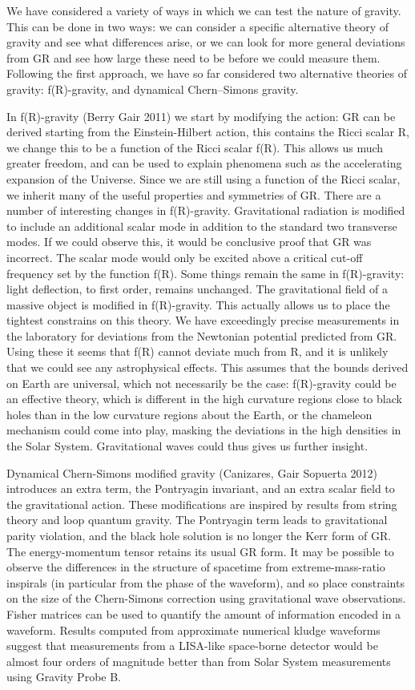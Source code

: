 We have considered a variety of ways in which we can test the nature of gravity. This can be done in two ways: we can consider a specific alternative theory of gravity and see what differences arise, or we can look for more general deviations from GR and see how large these need to be before we could measure them. Following the first approach, we have so far considered two alternative theories of gravity: f(R)-gravity, and dynamical Chern--Simons gravity.

In f(R)-gravity (Berry  Gair 2011) we start by modifying the action: GR can be derived starting from the Einstein-Hilbert action, this contains the Ricci scalar R, we change this to be a function of the Ricci scalar f(R). This allows us much greater freedom, and can be used to explain phenomena such as the accelerating expansion of the Universe. Since we are still using a function of the Ricci scalar, we inherit many of the useful properties and symmetries of GR. There are a number of interesting changes in f(R)-gravity. Gravitational radiation is modified to include an additional scalar mode in addition to the standard two transverse modes. If we could observe this, it would be conclusive proof that GR was incorrect. The scalar mode would only be excited above a critical cut-off frequency set by the function f(R). Some things remain the same in f(R)-gravity: light deflection, to first order, remains unchanged. The gravitational field of a massive object is modified in f(R)-gravity. This actually allows us to place the tightest constrains on this theory. We have exceedingly precise measurements in the laboratory for deviations from the Newtonian potential predicted from GR. Using these it seems that f(R) cannot deviate much from R, and it is unlikely that we could see any astrophysical effects. This assumes that the bounds derived on Earth are universal, which not necessarily be the case: f(R)-gravity could be an effective theory, which is different in the high curvature regions close to black holes than in the low curvature regions about the Earth, or the chameleon mechanism could come into play, masking the deviations in the high densities in the Solar System. Gravitational waves could thus gives us further insight.

Dynamical Chern-Simons modified gravity (Canizares, Gair  Sopuerta 2012) introduces an extra term, the Pontryagin invariant, and an extra scalar field to the gravitational action. These modifications are inspired by results from string theory and loop quantum gravity. The Pontryagin term leads to gravitational parity violation, and the black hole solution is no longer the Kerr form of GR. The energy-momentum tensor retains its usual GR form. It may be possible to observe the differences in the structure of spacetime from extreme-mass-ratio inspirals (in particular from the phase of the waveform), and so place constraints on the size of the Chern-Simons correction using gravitational wave observations. Fisher matrices can be used to quantify the amount of information encoded in a waveform. Results computed from approximate numerical kludge waveforms suggest that measurements from a LISA-like space-borne detector would be almost four orders of magnitude better than from Solar System measurements using Gravity Probe B.

